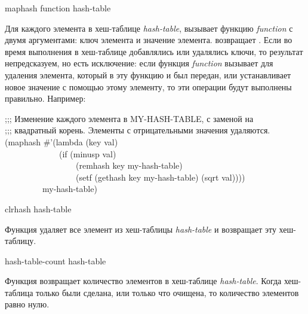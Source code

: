 \begin{defun}[Функция]
maphash function hash-table

Для каждого элемента в хеш-таблице \emph{hash-table},  вызывает
функцию \emph{function} с двумя аргументами:
ключ элемента и
значение элемента.
 возвращает .
Если во время выполнения  в хеш-таблице добавлялись или удалялись
ключи, то результат непредсказуем, но есть исключение:
если функция \emph{function} вызывает  для удаления элемента,
который в эту функцию и был передан, или устанавливает новое значение с помощью
 этому элементу, то эти операции будут выполнены правильно.
Например:
\begin{lisp}
;;; Изменение каждого элемента в MY-HASH-TABLE, с заменой на \\
;;; квадратный корень. Элементы с отрицательными значения удаляются. \\
(maphash \#'(lambda (key val) \\
~~~~~~~~~~~~~(if (minusp val) \\
~~~~~~~~~~~~~~~~~(remhash key my-hash-table) \\
~~~~~~~~~~~~~~~~~(setf (gethash key my-hash-table) (sqrt val)))) \\
~~~~~~~~~my-hash-table)
\end{lisp}
\end{defun}

\begin{defun}[Функция]
clrhash hash-table

Функция удаляет все элемент из хеш-таблицы \emph{hash-table} и возвращает эту
хеш-таблицу.
\end{defun}

\begin{defun}[Функция]
hash-table-count hash-table

Функция возвращает количество элементов в хеш-таблице \emph{hash-table}.
Когда хеш-таблица только были сделана, или только что очищена, то количество
элементов равно нулю.
\end{defun}

